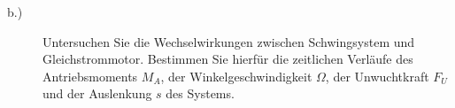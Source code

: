 \begin{description}
	\item[b.)]
	Untersuchen Sie die Wechselwirkungen zwischen Schwingsystem und Gleichstrommotor. Bestimmen Sie hierfür die zeitlichen Verläufe des Antriebsmoments $M_A$, der Winkelgeschwindigkeit $\Omega$, der Unwuchtkraft $F_U$ und der Auslenkung $s$ des Systems.
\end{description}
